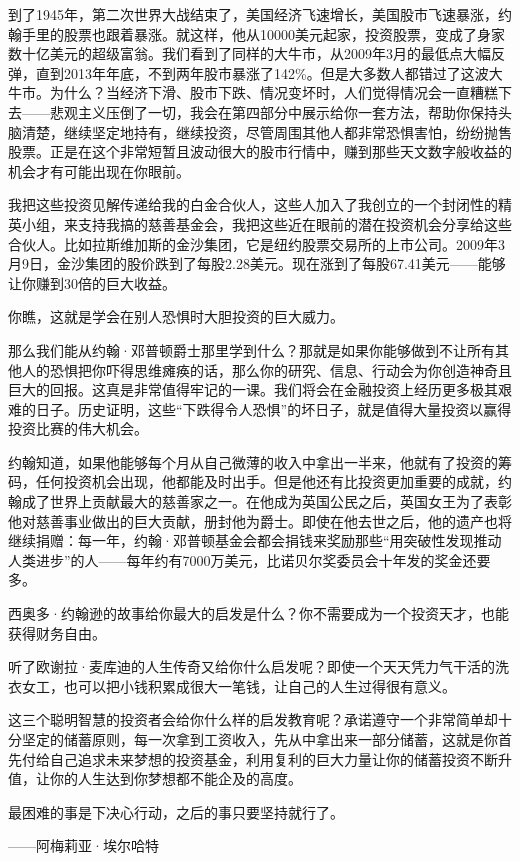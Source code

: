 到了1945年，第二次世界大战结束了，美国经济飞速增长，美国股市飞速暴涨，约翰手里的股票也跟着暴涨。就这样，他从10000美元起家，投资股票，变成了身家数十亿美元的超级富翁。我们看到了同样的大牛市，从2009年3月的最低点大幅反弹，直到2013年年底，不到两年股市暴涨了142\%。但是大多数人都错过了这波大牛市。为什么？当经济下滑、股市下跌、情况变坏时，人们觉得情况会一直糟糕下去——悲观主义压倒了一切，我会在第四部分中展示给你一套方法，帮助你保持头脑清楚，继续坚定地持有，继续投资，尽管周围其他人都非常恐惧害怕，纷纷抛售股票。正是在这个非常短暂且波动很大的股市行情中，赚到那些天文数字般收益的机会才有可能出现在你眼前。

我把这些投资见解传递给我的白金合伙人，这些人加入了我创立的一个封闭性的精英小组，来支持我搞的慈善基金会，我把这些近在眼前的潜在投资机会分享给这些合伙人。比如拉斯维加斯的金沙集团，它是纽约股票交易所的上市公司。2009年3月9日，金沙集团的股价跌到了每股2.28美元。现在涨到了每股67.41美元——能够让你赚到30倍的巨大收益。

你瞧，这就是学会在别人恐惧时大胆投资的巨大威力。

那么我们能从约翰·邓普顿爵士那里学到什么？那就是如果你能够做到不让所有其他人的恐惧把你吓得思维瘫痪的话，那么你的研究、信息、行动会为你创造神奇且巨大的回报。这真是非常值得牢记的一课。我们将会在金融投资上经历更多极其艰难的日子。历史证明，这些“下跌得令人恐惧”的坏日子，就是值得大量投资以赢得投资比赛的伟大机会。

约翰知道，如果他能够每个月从自己微薄的收入中拿出一半来，他就有了投资的筹码，任何投资机会出现，他都能及时出手。但是他还有比投资更加重要的成就，约翰成了世界上贡献最大的慈善家之一。在他成为英国公民之后，英国女王为了表彰他对慈善事业做出的巨大贡献，册封他为爵士。即使在他去世之后，他的遗产也将继续捐赠：每一年，约翰·邓普顿基金会都会捐钱来奖励那些“用突破性发现推动人类进步”的人——每年约有7000万美元，比诺贝尔奖委员会十年发的奖金还要多。

西奥多·约翰逊的故事给你最大的启发是什么？你不需要成为一个投资天才，也能获得财务自由。

听了欧谢拉·麦库迪的人生传奇又给你什么启发呢？即使一个天天凭力气干活的洗衣女工，也可以把小钱积累成很大一笔钱，让自己的人生过得很有意义。

这三个聪明智慧的投资者会给你什么样的启发教育呢？承诺遵守一个非常简单却十分坚定的储蓄原则，每一次拿到工资收入，先从中拿出来一部分储蓄，这就是你首先付给自己追求未来梦想的投资基金，利用复利的巨大力量让你的储蓄投资不断升值，让你的人生达到你梦想都不能企及的高度。

\begin{BookQuote}
最困难的事是下决心行动，之后的事只要坚持就行了。

\hfill ——阿梅莉亚·埃尔哈特
\end{BookQuote}

